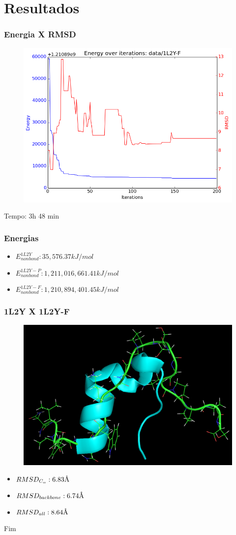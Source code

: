 \documentclass{beamer}
\newcommand{\angstrom}{\textup{\AA}}
\begin{document}
\section{Resultados} %

\begin{frame}
\frametitle{Energia X RMSD}
\begin{figure}
\includegraphics[width=0.7\linewidth]{1L2Y-F200_energy.png}
\end{figure}
Tempo: 3h 48 min
\end{frame}

\begin{frame}
\frametitle{Energias}
\begin{itemize}
  \item $E_{nonbond}^{1L2Y}: 35,576.37 kJ/mol$
  \item $E_{nonbond}^{1L2Y-P}: 1,211,016,661.41 kJ/mol$
  \item $E_{nonbond}^{1L2Y-F}: 1,210,894,401.45 kJ/mol$
\end{itemize} 
\end{frame}

\begin{frame}
\frametitle{1L2Y X 1L2Y-F}
\begin{figure}
\includegraphics[width=0.6\linewidth]{1L2Y-F.png}
\end{figure}
\begin{itemize}
  \item $RMSD_{C_\alpha}: 6.83\angstrom$
  \item $RMSD_{backbone}: 6.74\angstrom$
  \item $RMSD_{all}: 8.64\angstrom$ 
\end{itemize}
\end{frame}

\begin{frame}
\Huge{\centerline{Fim}}
\end{frame}

\end{document}
